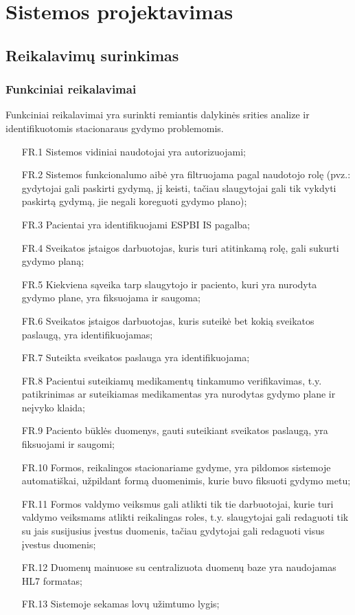 \section{Sistemos projektavimas}

\subsection{Reikalavimų surinkimas}

\subsubsection{Funkciniai reikalavimai}

Funkciniai reikalavimai yra surinkti remiantis dalykinės srities analize ir identifikuotomis stacionaraus gydymo problemomis.
\begin{itemize}
    \item [FR.1] Sistemos vidiniai naudotojai yra autorizuojami;
    \item [FR.2] Sistemos funkcionalumo aibė yra filtruojama pagal naudotojo rolę (pvz.: gydytojai gali paskirti gydymą, jį keisti, tačiau slaugytojai gali tik vykdyti paskirtą gydymą, jie negali koreguoti gydymo plano);
    \item [FR.3] Pacientai yra identifikuojami ESPBI IS pagalba;
    \item [FR.4] Sveikatos įstaigos darbuotojas, kuris turi atitinkamą rolę, gali sukurti gydymo planą;
    \item [FR.5] Kiekviena sąveika tarp slaugytojo ir paciento, kuri yra nurodyta gydymo plane, yra fiksuojama ir saugoma;
    \item [FR.6] Sveikatos įstaigos darbuotojas, kuris suteikė bet kokią sveikatos paslaugą, yra identifikuojamas;
    \item [FR.7] Suteikta sveikatos paslauga yra identifikuojama;
    \item [FR.8] Pacientui suteikiamų medikamentų tinkamumo verifikavimas, t.y. patikrinimas ar suteikiamas medikamentas yra nurodytas gydymo plane ir neįvyko klaida;
    \item [FR.9] Paciento būklės duomenys, gauti suteikiant sveikatos paslaugą, yra fiksuojami ir saugomi;
    \item [FR.10] Formos, reikalingos stacionariame gydyme, yra pildomos sistemoje automatiškai, užpildant formą duomenimis, kurie buvo fiksuoti gydymo metu;
    \item [FR.11] Formos valdymo veiksmus gali atlikti tik tie darbuotojai, kurie turi valdymo veiksmams atlikti reikalingas roles, t.y. slaugytojai gali redaguoti tik su jais susijusius įvestus duomenis, tačiau gydytojai gali redaguoti visus įvestus duomenis;
    \item [FR.12] Duomenų mainuose su centralizuota duomenų baze yra naudojamas HL7 formatas;
    \item [FR.13] Sistemoje sekamas lovų užimtumo lygis;
\end{itemize}

